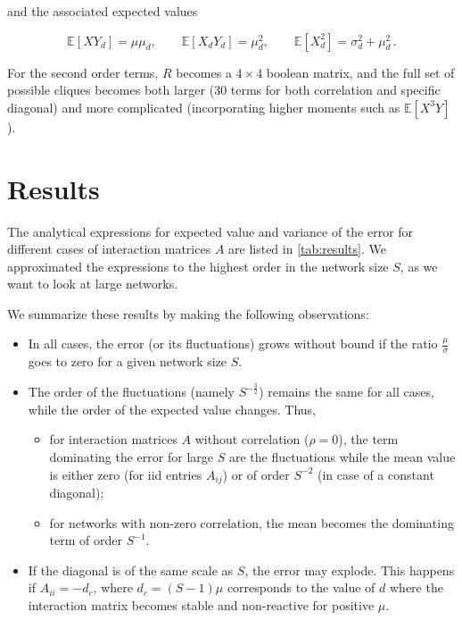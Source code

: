 \documentclass[10pt]{article}
\begin{document}
and the associated expected values

\begin{equation}
    \mathbb{E}[XY_d] = \mu\mu_d, \qquad \mathbb{E}[X_dY_d] = \mu_d^2, \qquad \mathbb{E}[X_d^2] = \sigma_d^2 + \mu_d^2\,.
\end{equation}

For the second order terms, $R$ becomes a $4 \times 4$ boolean matrix, and the full set of possible cliques
becomes both larger (30 terms for both correlation and specific diagonal) and more complicated 
(incorporating higher moments such as $\mathbb{E}[X^3Y]$). 


\section{Results}
\label{sec:results}

The analytical expressions for expected value and variance of the error
for different cases of interaction matrices $A$ are listed in \autoref{tab:results}.
We approximated the expressions to the highest order in the network size $S$, 
as we want to look at large networks.

We summarize these results by making the following observations:
\begin{itemize}
        \item 
        In all cases, the error (or its fluctuations) grows without bound if the ratio $\frac{\mu}{\sigma}$ goes to zero 
 for a given network size $S$.
 
\item The order of the fluctuations (namely $S^{-\frac{3}{2}}$) remains the same for all cases,
    while the order of the expected value changes. Thus,
 \begin{itemize}
     \item  for interaction matrices $A$ without correlation ($\rho = 0$), the term dominating the error for large $S$ 
         are the fluctuations while the mean value is either zero (for iid entries $A_{ij}$)
         or of order $S^{-2}$ (in case of a constant diagonal);
     \item for networks with non-zero correlation, the mean becomes the dominating term of order $S^{-1}$.  
 \end{itemize}

 \item  If the diagonal is of the same scale as $S$, the error may explode. This happens if
     $A_{ii} = - d_c$, where $d_c = (S - 1) \mu$  corresponds to the value of $d$ where the 
     interaction matrix becomes stable and non-reactive for positive $\mu$. 
\end{itemize}   
\end{document}
